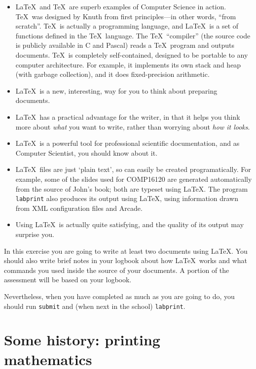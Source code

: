 \begin{itemize}
\item \LaTeX\ and \TeX\ are superb examples of Computer Science in action. \TeX\ was designed by Knuth from first principles---in other words, ``from scratch''.  \TeX\ is actually a programming language, and \LaTeX\ is a set of functions defined in the \TeX\ language. The \TeX\ ``compiler''  (the source code is publicly available in C and Pascal)  reads a \TeX\ program and outputs documents. \TeX\ is completely self-contained, designed to be portable to any computer architecture. For example, it implements its own stack and heap (with garbage collection), and it does fixed-precision arithmetic. 
\item \LaTeX\ is a new, interesting, way for you to think about preparing documents. 
\item \LaTeX\ has a practical advantage for the writer, in that it helps you think more about \emph{what} you want to write, rather than worrying about \emph{how it looks}.
\item \LaTeX\ is a powerful tool for professional scientific documentation, and as Computer Scientist, you should know about it.
\item \LaTeX\ files are just `plain text', so can easily be created programatically. For example, some of the slides used for COMP16120 are generated automatically from the source of John's book; both are typeset using \LaTeX. The program \texttt{labprint} also produces its output using \LaTeX, using information drawn from XML configuration files and Arcade.
  
\item Using \LaTeX\ is actually quite satisfying, and the quality of its output may surprise you.
\end{itemize}

In this exercise you are going to write at least two documents using \LaTeX. You should also write brief notes in your logbook about how \LaTeX\ works and what commands you used inside the source of your documents. A portion of the assessment will be based on your logbook. 

Nevertheless, when you have completed as much as you are going to do, you should run \texttt{submit} and (when next in the school) \texttt{labprint}.

\section{Some history: printing mathematics}


